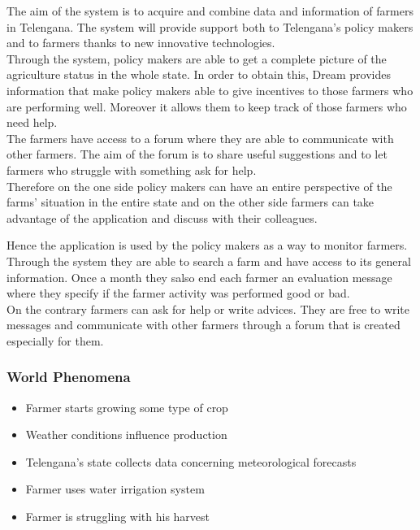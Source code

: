 The aim of the system is to acquire and combine data and information of farmers in Telengana. 
The system will provide support both to Telengana’s policy makers and to farmers 
thanks to new innovative technologies.\\
Through the system, policy makers are able 
to get a complete picture of the agriculture status in the whole state. In order 
to obtain this, Dream provides information that make policy makers able to give 
incentives to those farmers who are performing well. Moreover it allows them to 
keep track of those farmers who need help. \\
The farmers have access to a forum where they are able to communicate with other 
farmers. The aim of the forum is to share useful suggestions and to let farmers 
who struggle with something ask for help. \\
Therefore on the one side policy makers can have an entire perspective of the farms’ 
situation in the entire state and on the other side farmers can take advantage of the 
application and discuss with their colleagues.
\par 
Hence the application is used by the policy makers as a way to monitor farmers. 
Through the system they are able to search a farm and have access to its general information. 
Once a month they salso end each farmer an evaluation message where they specify if the farmer activity was
performed good or bad.\\
On the contrary farmers can ask for help or write advices. They are free to write messages and communicate with other farmers through a forum 
that is created especially for them.




\subsubsection{World Phenomena}
\begin{itemize}
    \item Farmer starts growing some type of crop
    \item Weather conditions influence production
    \item Telengana’s state collects data concerning meteorological forecasts
    \item Farmer uses water irrigation system
    \item Farmer is struggling with his harvest  
    
\end{itemize}

